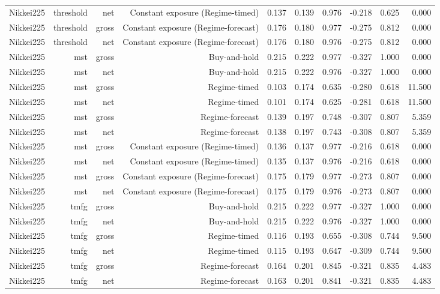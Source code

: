 \begin{tabular}{lrrrrrrrrr}
Nikkei225 & threshold & net & Constant exposure (Regime-timed) & 0.137 & 0.139 & 0.976 & -0.218 & 0.625 & 0.000 \\
Nikkei225 & threshold & gross & Constant exposure (Regime-forecast) & 0.176 & 0.180 & 0.977 & -0.275 & 0.812 & 0.000 \\
Nikkei225 & threshold & net & Constant exposure (Regime-forecast) & 0.176 & 0.180 & 0.976 & -0.275 & 0.812 & 0.000 \\
Nikkei225 & mst & gross & Buy-and-hold & 0.215 & 0.222 & 0.977 & -0.327 & 1.000 & 0.000 \\
Nikkei225 & mst & net & Buy-and-hold & 0.215 & 0.222 & 0.976 & -0.327 & 1.000 & 0.000 \\
Nikkei225 & mst & gross & Regime-timed & 0.103 & 0.174 & 0.635 & -0.280 & 0.618 & 11.500 \\
Nikkei225 & mst & net & Regime-timed & 0.101 & 0.174 & 0.625 & -0.281 & 0.618 & 11.500 \\
Nikkei225 & mst & gross & Regime-forecast & 0.139 & 0.197 & 0.748 & -0.307 & 0.807 & 5.359 \\
Nikkei225 & mst & net & Regime-forecast & 0.138 & 0.197 & 0.743 & -0.308 & 0.807 & 5.359 \\
Nikkei225 & mst & gross & Constant exposure (Regime-timed) & 0.136 & 0.137 & 0.977 & -0.216 & 0.618 & 0.000 \\
Nikkei225 & mst & net & Constant exposure (Regime-timed) & 0.135 & 0.137 & 0.976 & -0.216 & 0.618 & 0.000 \\
Nikkei225 & mst & gross & Constant exposure (Regime-forecast) & 0.175 & 0.179 & 0.977 & -0.273 & 0.807 & 0.000 \\
Nikkei225 & mst & net & Constant exposure (Regime-forecast) & 0.175 & 0.179 & 0.976 & -0.273 & 0.807 & 0.000 \\
Nikkei225 & tmfg & gross & Buy-and-hold & 0.215 & 0.222 & 0.977 & -0.327 & 1.000 & 0.000 \\
Nikkei225 & tmfg & net & Buy-and-hold & 0.215 & 0.222 & 0.976 & -0.327 & 1.000 & 0.000 \\
Nikkei225 & tmfg & gross & Regime-timed & 0.116 & 0.193 & 0.655 & -0.308 & 0.744 & 9.500 \\
Nikkei225 & tmfg & net & Regime-timed & 0.115 & 0.193 & 0.647 & -0.309 & 0.744 & 9.500 \\
Nikkei225 & tmfg & gross & Regime-forecast & 0.164 & 0.201 & 0.845 & -0.321 & 0.835 & 4.483 \\
Nikkei225 & tmfg & net & Regime-forecast & 0.163 & 0.201 & 0.841 & -0.321 & 0.835 & 4.483 \\

\end{tabular}
